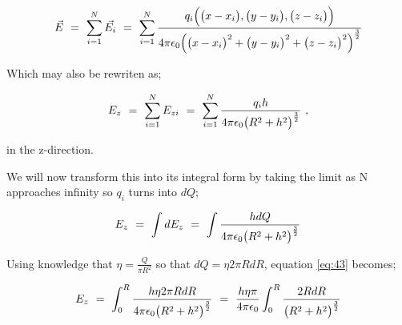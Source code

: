 \documentclass{article}
\begin{document}
\begin{equation} \label{eq:44}
\vec{E} \hspace{0.125cm} = \hspace{0.125cm} \sum_{i=1}^{N} \vec{E_{i}}
\hspace{0.125cm} = \hspace{0.125cm} \sum_{i=1}^{N} \frac{q_{i}\Big(\big(x - x_{i}\big) , \big(y - y_{i}\big) , \big(z - z_{i}\big)\Big)}{4\pi \epsilon_{0} \Big(\big(x - x_{i}\big)^2 + \big(y - y_{i}\big)^2 + \big(z - z_{i}\big)^2\Big)^{\frac{3}{2}}}
\end{equation}

Which may also be rewriten as;

\begin{equation} \label{eq:45}
E_{z} \hspace{0.125cm} = \hspace{0.125cm} \sum_{i=1}^{N} E_{zi}
\hspace{0.125cm} = \hspace{0.125cm} \sum_{i=1}^{N} \frac{q_{i}h}{4\pi \epsilon_{0} \big( R^{2} + h^2\big)^{\frac{3}{2}}} \hspace{0.125cm} , 
\end{equation}

in the z-direction. 

We will now transform this into its integral form by taking the limit as N approaches infinity so \begin{math} q_{i} \end{math} turns into \begin{math} dQ \end{math};

\begin{equation} \label{eq:46}
E_{z} \hspace{0.125cm} = \hspace{0.125cm} \int d E_{z}  \hspace{0.125cm} = \hspace{0.125cm} \int \frac{h dQ}{4\pi \epsilon_{0} \big( R^{2} + h^2\big)^{\frac{3}{2}}}
\end{equation}

Using knowledge that \begin{math} \eta = \frac{Q}{\pi R^{2}} \end{math} so that \begin{math} dQ = \eta 2 \pi R dR \end{math}, equation \ref{eq:43} becomes;

\begin{equation} \label{eq:47}
E_{z} \hspace{0.125cm} = \hspace{0.125cm} \int_{0}^{R} \frac{h \eta 2 \pi R dR}{4\pi \epsilon_{0} \big( R^{2} + h^2\big)^{\frac{3}{2}}} \hspace{0.125cm} = \hspace{0.125cm} \frac{h \eta \pi}{4\pi \epsilon_{0}} \int_{0}^{R} \frac{2R dR}{\big( R^{2} + h^2\big)^{\frac{3}{2}}}
\end{equation}
\end{document}
